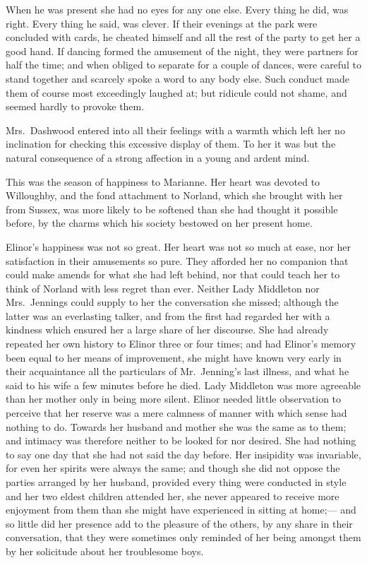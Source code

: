\documentclass{article}
\begin{document}
When he was present she had no eyes for any one else.
Every thing he did, was right.  Every thing he said, was clever.
If their evenings at the park were concluded with cards,
he cheated himself and all the rest of the party to get
her a good hand.  If dancing formed the amusement
of the night, they were partners for half the time;
and when obliged to separate for a couple of dances,
were careful to stand together and scarcely spoke a word
to any body else.  Such conduct made them of course
most exceedingly laughed at; but ridicule could not shame,
and seemed hardly to provoke them.

Mrs.\ Dashwood entered into all their feelings with
a warmth which left her no inclination for checking this
excessive display of them.  To her it was but the natural
consequence of a strong affection in a young and ardent mind.

This was the season of happiness to Marianne.
Her heart was devoted to Willoughby, and the fond attachment
to Norland, which she brought with her from Sussex,
was more likely to be softened than she had thought it
possible before, by the charms which his society bestowed
on her present home.

Elinor's happiness was not so great.  Her heart was not
so much at ease, nor her satisfaction in their amusements
so pure.  They afforded her no companion that could make
amends for what she had left behind, nor that could teach
her to think of Norland with less regret than ever.
Neither Lady Middleton nor Mrs.\ Jennings could supply
to her the conversation she missed; although the latter
was an everlasting talker, and from the first had regarded
her with a kindness which ensured her a large share of
her discourse.  She had already repeated her own history
to Elinor three or four times; and had Elinor's memory been
equal to her means of improvement, she might have known
very early in their acquaintance all the particulars of
Mr.\ Jenning's last illness, and what he said to his wife
a few minutes before he died.  Lady Middleton was more
agreeable than her mother only in being more silent.
Elinor needed little observation to perceive that her
reserve was a mere calmness of manner with which sense
had nothing to do.  Towards her husband and mother she
was the same as to them; and intimacy was therefore
neither to be looked for nor desired.  She had nothing
to say one day that she had not said the day before.
Her insipidity was invariable, for even her spirits were
always the same; and though she did not oppose the parties
arranged by her husband, provided every thing were conducted
in style and her two eldest children attended her,
she never appeared to receive more enjoyment from them
than she might have experienced in sitting at home;---%
and so little did her presence add to the pleasure
of the others, by any share in their conversation,
that they were sometimes only reminded of her being
amongst them by her solicitude about her troublesome boys.
\end{document}
